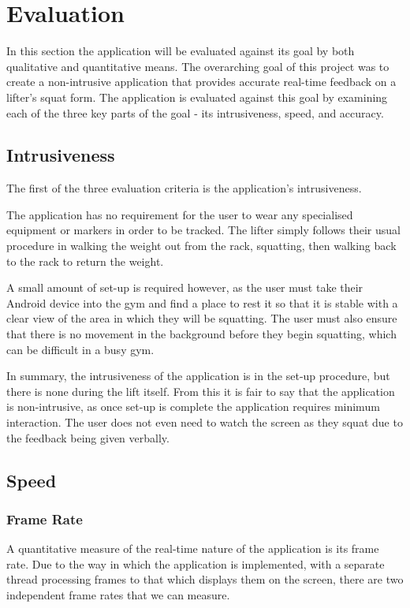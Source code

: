 \section{Evaluation}

In this section the application will be evaluated against its goal by both qualitative and quantitative means. The overarching goal of this project was to create a non-intrusive application that provides accurate real-time feedback on a lifter's squat form. The application is evaluated against this goal by examining each of the three key parts of the goal - its intrusiveness, speed, and accuracy.

\subsection{Intrusiveness}
The first of the three evaluation criteria is the application's intrusiveness. 

The application has no requirement for the user to wear any specialised equipment or markers in order to be tracked. The lifter simply follows their usual procedure in walking the weight out from the rack, squatting, then walking back to the rack to return the weight.

A small amount of set-up is required however, as the user must take their Android device into the gym and find a place to rest it so that it is stable with a clear view of the area in which they will be squatting. The user must also ensure that there is no movement in the background before they begin squatting, which can be difficult in a busy gym.

In summary, the intrusiveness of the application is in the set-up procedure, but there is none during the lift itself. From this it is fair to say that the application is non-intrusive, as once set-up is complete the application requires minimum interaction. The user does not even need to watch the screen as they squat due to the feedback being given verbally.

\subsection{Speed}

\subsubsection{Frame Rate}
A quantitative measure of the real-time nature of the application is its frame rate. Due to the way in which the application is implemented, with a separate thread processing frames to that which displays them on the screen, there are two independent frame rates that we can measure.

